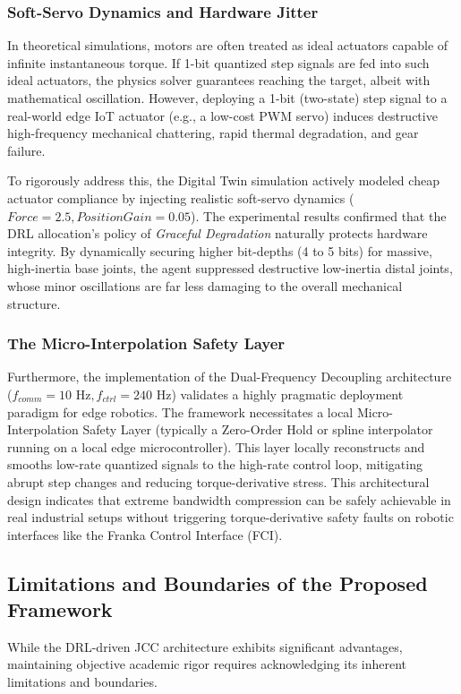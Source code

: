 \subsubsection{Soft-Servo Dynamics and Hardware Jitter}
In theoretical simulations, motors are often treated as ideal actuators capable of infinite instantaneous torque. If 1-bit quantized 
step signals are fed into such ideal actuators, the physics solver guarantees reaching the target, albeit with mathematical oscillation. 
However, deploying a 1-bit (two-state) step signal to a real-world edge IoT actuator (e.g., a low-cost PWM servo) induces destructive high-frequency 
mechanical chattering, rapid thermal degradation, and gear failure.

To rigorously address this, the Digital Twin simulation actively modeled cheap actuator compliance by injecting realistic soft-servo dynamics ($Force=2.5, PositionGain=0.05$). 
The experimental results confirmed that the DRL allocation's policy of \textit{Graceful Degradation} naturally protects hardware integrity. 
By dynamically securing higher bit-depths (4 to 5 bits) for massive, high-inertia base joints, the agent suppressed destructive low-inertia distal 
joints, whose minor oscillations are far less damaging to the overall mechanical structure.
\subsubsection{The Micro-Interpolation Safety Layer}
Furthermore, the implementation of the Dual-Frequency Decoupling architecture ($f_{comm} = 10 \text{ Hz}, f_{ctrl} = 240 \text{ Hz}$)
validates a highly pragmatic deployment paradigm for edge robotics. The framework necessitates a local Micro-Interpolation Safety Layer 
(typically a Zero-Order Hold or spline interpolator running on a local edge microcontroller). This layer locally reconstructs and smooths low-rate quantized signals to the high-rate control loop, mitigating abrupt step changes and reducing torque-derivative stress. This architectural design indicates that extreme bandwidth compression can be safely achievable in real industrial setups without triggering torque-derivative 
safety faults on robotic interfaces like the Franka Control Interface (FCI).
\subsection{Limitations and Boundaries of the Proposed Framework}
While the DRL-driven JCC architecture exhibits significant advantages, maintaining objective academic rigor requires acknowledging 
its inherent limitations and boundaries.

